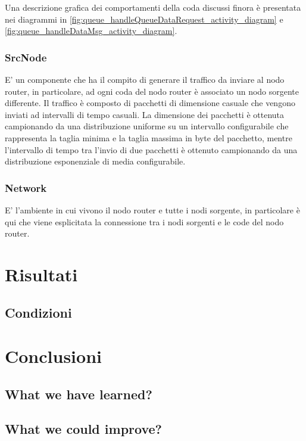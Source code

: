 \documentclass[conference]{IEEEtran}
\begin{document}
Una descrizione grafica dei comportamenti della coda discussi finora è presentata
nei diagrammi in \autoref{fig:queue_handleQueueDataRequest_activity_diagram} e 
\autoref{fig:queue_handleDataMsg_activity_diagram}.

\subsubsection{SrcNode}
E' un componente che ha il compito di generare il traffico da inviare al nodo router, in particolare, ad ogni coda del nodo router è associato un nodo sorgente differente. Il traffico è composto di pacchetti di dimensione casuale che vengono inviati ad intervalli di tempo casuali. La dimensione dei pacchetti è ottenuta campionando da una distribuzione uniforme su un intervallo configurabile che rappresenta la taglia minima e la taglia massima in byte del pacchetto, mentre l'intervallo di tempo tra l'invio di due pacchetti è ottenuto campionando da una distribuzione esponenziale di media configurabile.

\subsubsection{Network}
E' l'ambiente in cui vivono il nodo router e tutte i nodi sorgente, in particolare è qui che viene esplicitata la connessione tra i nodi sorgenti e le code del nodo router. 

\section{Risultati}

\subsection{Condizioni}


\section{Conclusioni}

\subsection{What we have learned?}

\subsection{What we could improve?}
\end{document}
